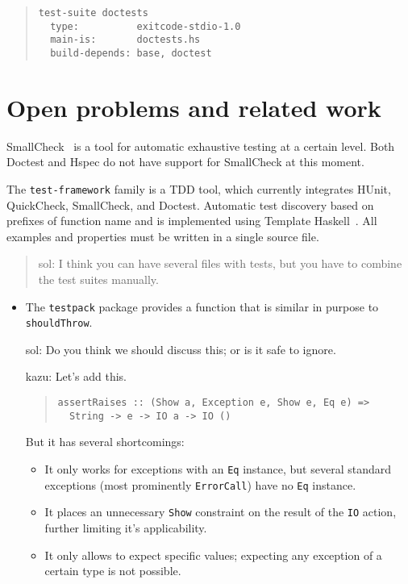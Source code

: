\documentclass[preprint]{sigplanconf}
\begin{document}
\begin{quote}
\small
\begin{verbatim}
test-suite doctests
  type:          exitcode-stdio-1.0
  main-is:       doctests.hs
  build-depends: base, doctest
\end{verbatim}
\end{quote}

\section{Open problems and related work}

SmallCheck~\cite{smallcheck} is a tool for
automatic exhaustive testing at a certain level.
Both Doctest and Hspec do not have support for SmallCheck
at this moment.

The {\tt test-framework} family is a TDD tool,
which currently integrates HUnit, QuickCheck, SmallCheck, and Doctest.
Automatic test discovery based on prefixes of function name
and is implemented using Template Haskell~\cite{template-haskell}.
All examples and properties must be written in a single
source file.

\begin{quote}
    sol: I think you can have several files with tests, but you have
    to combine the test suites manually.
\end{quote}


\begin{itemize}
    \item The {\tt testpack} package provides a function that is
        similar in purpose to {\tt shouldThrow}.

        sol: Do you think we should discuss this; or is it safe to
        ignore.

        kazu: Let's add this.

\begin{quote}\small\begin{verbatim}
assertRaises :: (Show a, Exception e, Show e, Eq e) =>
  String -> e -> IO a -> IO ()
\end{verbatim}\end{quote}
        But it has several shortcomings:
        \begin{itemize}
            \item
                It only works for exceptions with an {\tt Eq}
                instance, but several standard exceptions (most
                prominently {\tt ErrorCall}) have no {\tt Eq}
                instance.
            \item
                It places an unnecessary {\tt Show} constraint on the
                result of the {\tt IO} action, further limiting it's
                applicability.
            \item
                It only allows to expect specific values; expecting
                any exception of a certain type is not possible.
        \end{itemize}
\end{itemize}
\end{document}
